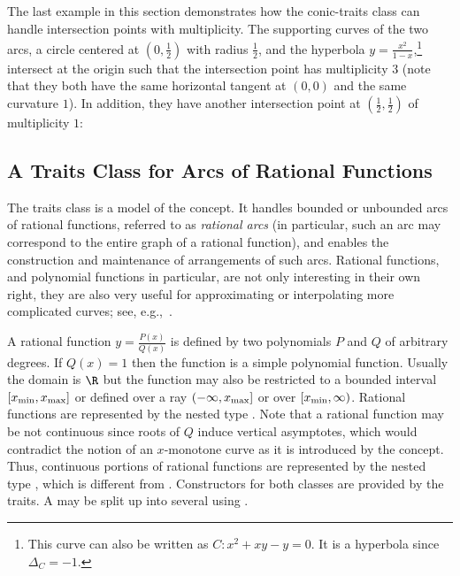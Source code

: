 
The last example in this section demonstrates how the conic-traits
class can handle intersection points with multiplicity. The
supporting curves of the two arcs, a circle centered at
$(0,\frac{1}{2})$ with radius $\frac{1}{2}$, and the hyperbola $y
= \frac{x^2}{1-x}$,\footnote{This curve can also be written as $C:
x^2 + xy - y = 0$. It is a hyperbola since $\Delta_{C} = -1$.}
intersect at the origin such that the intersection point has
multiplicity $3$ (note that they both have the same horizontal
tangent at $(0,0)$ and the same curvature $1$). In addition, they
have another intersection point at $(\frac{1}{2},\frac{1}{2})$ of
multiplicity $1$:


\subsection{A Traits Class for Arcs of Rational Functions\label{arr_ssec:tr_ratfunc}}

The traits class
 is a model
of the  concept. It handles bounded or
unbounded arcs of rational functions, referred to as
\emph{rational arcs} (in particular, such an arc may correspond to the
entire graph of a rational function), and enables the construction and
maintenance of arrangements of such arcs. Rational functions, and
polynomial functions in particular, are not only interesting in their
own right, they are also very useful for approximating or
interpolating more complicated curves; see,
e.g.,~\cite[Chapter~3]{cgal:ptvf-nrcpp-02}.

A rational function $y = \frac{P(x)}{Q(x)}$ is defined by two
polynomials $P$ and $Q$ of arbitrary degrees.  If $Q(x) = 1$ then
the function is a simple polynomial function. Usually the domain is
$\R$ but the function may also be restricted to a bounded interval
$[x_{\rm min}, x_{\rm max}]$ or defined over a ray
$(-\infty, x_{\rm max}]$ or over $[x_{\rm min}, \infty)$. Rational
functions are represented by the nested type . Note
that a rational function may be not continuous since roots of $Q$
induce vertical asymptotes, which would contradict the notion of an
$x$-monotone curve as it is introduced by the 
concept. Thus, continuous portions of rational functions are
represented by the nested type , which is
different from . Constructors for both classes are
provided by the traits. A  may be split up into several
 using .

